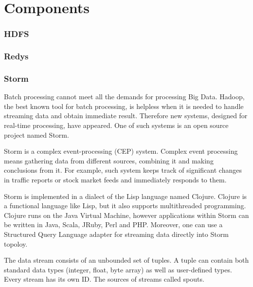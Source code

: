 \chapter{Components}
\label{chap:components}



\subsection{HDFS}

\subsection{Redys}


\subsection{Storm}
Batch processing cannot meet all the demands for processing Big Data.
Hadoop, the best known tool for batch processing, is helpless when it is needed to handle streaming data and obtain immediate result.
Therefore new systems, designed for real-time processing, have appeared.
One of such systems is an open source project named Storm.

Storm is a complex event-processing (CEP) system.
Complex event processing means gathering data from different sources, combining it and making conclusions from it.
For example, such system keeps track of significant changes in traffic reports or stock market feeds and immediately responds to them. 

Storm is implemented in a dialect of the Lisp language named Clojure.
Clojure is a functional language like Lisp, but it also supports multithreaded programming.
Clojure runs on the Java Virtual Machine, however applications within Storm can be written in Java, Scala, JRuby, Perl and PHP.
Moreover, one can use a Structured Query Language adapter for streaming data directly into Storm topoloy.

The data stream consists of an unbounded set of tuples.
A tuple can contain both standard data types (integer, float, byte array) as well as user-defined types.
Every stream has its own ID.
The sources of streams called spouts. 


